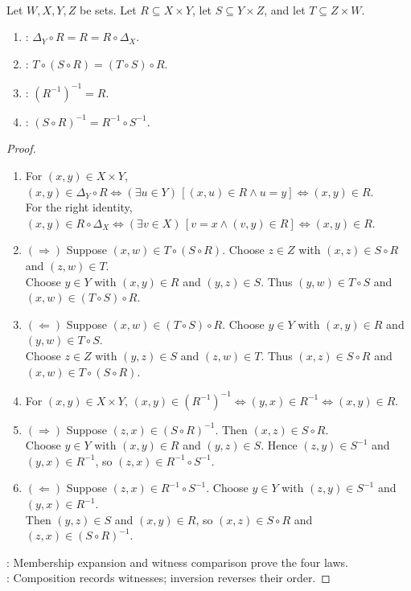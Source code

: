 \begin{proposition} \label{prop:inverse-and-composition-laws} \\
Let $W,X,Y,Z$ be sets. Let $R\subseteq X\times Y$, let $S\subseteq Y\times Z$, and let $T\subseteq Z\times W$.
\begin{enumerate}[label=(\roman*)]
\setlength{\itemsep}{0pt}
\item {}: $\Delta_Y\circ R=R=R\circ\Delta_X$.
\item {}: $T\circ(S\circ R)=(T\circ S)\circ R$.
\item {}: $(R^{-1})^{-1}=R$.
\item {}: $(S\circ R)^{-1}=R^{-1}\circ S^{-1}$.
\end{enumerate}
\begin{proof}
\begin{enumerate}[label=(\roman*)]
\setlength{\itemsep}{0pt}
\item[$(i)$] For $(x,y)\in X\times Y$, $(x,y)\in\Delta_Y\circ R\Longleftrightarrow(\exists u\in Y)\,[(x,u)\in R\land u=y]\Longleftrightarrow(x,y)\in R$.\\
For the right identity, $(x,y)\in R\circ\Delta_X\Longleftrightarrow(\exists v\in X)\,[v=x\land(v,y)\in R]\Longleftrightarrow(x,y)\in R$.
\item[$(ii)$]$(\Rightarrow)$ Suppose $(x,w)\in T\circ(S\circ R)$. Choose $z\in Z$ with $(x,z)\in S\circ R$ and $(z,w)\in T$.\\
Choose $y\in Y$ with $(x,y)\in R$ and $(y,z)\in S$. Thus $(y,w)\in T\circ S$ and $(x,w)\in(T\circ S)\circ R$.
\item[$(ii)$]$(\Leftarrow)$ Suppose $(x,w)\in(T\circ S)\circ R$. Choose $y\in Y$ with $(x,y)\in R$ and $(y,w)\in T\circ S$.\\
Choose $z\in Z$ with $(y,z)\in S$ and $(z,w)\in T$. Thus $(x,z)\in S\circ R$ and $(x,w)\in T\circ(S\circ R)$.
\item[$(iii)$] For $(x,y)\in X\times Y$, $(x,y)\in(R^{-1})^{-1}\Longleftrightarrow(y,x)\in R^{-1}\Longleftrightarrow(x,y)\in R$.
\item[$(iv)$]$(\Rightarrow)$ Suppose $(z,x)\in(S\circ R)^{-1}$. Then $(x,z)\in S\circ R$.\\
Choose $y\in Y$ with $(x,y)\in R$ and $(y,z)\in S$. Hence $(z,y)\in S^{-1}$ and $(y,x)\in R^{-1}$, so $(z,x)\in R^{-1}\circ S^{-1}$.
\item[$(iv)$]$(\Leftarrow)$ Suppose $(z,x)\in R^{-1}\circ S^{-1}$. Choose $y\in Y$ with $(z,y)\in S^{-1}$ and $(y,x)\in R^{-1}$.\\
Then $(y,z)\in S$ and $(x,y)\in R$, so $(x,z)\in S\circ R$ and $(z,x)\in(S\circ R)^{-1}$.
\end{enumerate}
: Membership expansion and witness comparison prove the four laws.\\
: Composition records witnesses; inversion reverses their order.
\end{proof}
\end{proposition}

